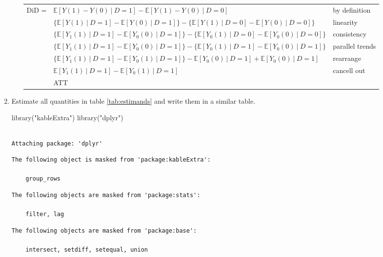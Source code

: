 \documentclass[
  12pt,
  letterpaper,
  DIV=11,
  numbers=noendperiod]{scrartcl}
\newenvironment{Shaded}{\begin{snugshade}}{\end{snugshade}}
\newcommand{\FunctionTok}[1]{\textcolor[rgb]{0.28,0.35,0.67}{#1}}
\newcommand{\NormalTok}[1]{\textcolor[rgb]{0.00,0.23,0.31}{#1}}
\newcommand{\StringTok}[1]{\textcolor[rgb]{0.13,0.47,0.30}{#1}}
\newcommand{\E}{\mathbb{E}}
\newcommand{\1}[1]{\mathds{1}\left[#1\right]}
\begin{document}
\begin{enumerate}
\begin{enumerate}
\begin{tabular}{l l l}
DiD = & $\E[Y(1)-Y(0)~|~D=1] - \E[Y(1)-Y(0)~|~D=0]$ & by definition\\
      & $\{\E[Y(1)~|~D=1]-\E[Y(0)~|~D=1]\} - \{\E[Y(1)~|~D=0]-\E[Y(0)~|~D=0]\}$ & linearity \\
      & $\{\E[Y_1(1)~|~D=1]-\E[Y_0(0)~|~D=1]\} - \{\E[Y_0(1)~|~D=0]-\E[Y_0(0)~|~D=0]\}$ & consistency \\ 
      & $\{\E[Y_1(1)~|~D=1]-\E[Y_0(0)~|~D=1]\} - \{\E[Y_0(1)~|~D=1]-\E[Y_0(0)~|~D=1]\}$ & parallel trends \\ 
      &  $\{\E[Y_1(1)~|~D=1]-\E[Y_0(1)~|~D=1]\} -\E[Y_0(0)~|~D=1]+\E[Y_0(0)~|~D=1]$ & rearrange \\
      & $\E[Y_1(1)~|~D=1]-\E[Y_0(1)~|~D=1]$ & cancell out\\
      & ATT
\end{tabular}

\end{enumerate}

\item

Estimate all quantities in table \ref{tab:estimands} and write them in a
similar table.

\begin{Shaded}
\begin{Highlighting}[]
\FunctionTok{library}\NormalTok{(}\StringTok{"kableExtra"}\NormalTok{)}
\FunctionTok{library}\NormalTok{(}\StringTok{"dplyr"}\NormalTok{)}
\end{Highlighting}
\end{Shaded}

\begin{verbatim}

Attaching package: 'dplyr'
\end{verbatim}

\begin{verbatim}
The following object is masked from 'package:kableExtra':

    group_rows
\end{verbatim}

\begin{verbatim}
The following objects are masked from 'package:stats':

    filter, lag
\end{verbatim}

\begin{verbatim}
The following objects are masked from 'package:base':

    intersect, setdiff, setequal, union
\end{verbatim}


\end{enumerate}
\end{document}
